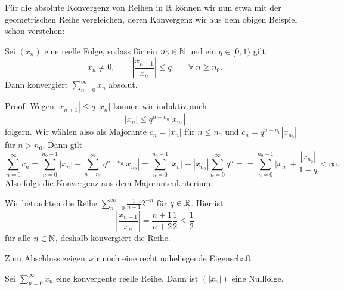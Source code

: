 Für die absolute Konvergenz von Reihen in \(\mathbb{R}\) können wir nun etwa mit der geometrischen Reihe vergleichen, deren Konvergenz wir aus dem obigen Beispiel schon verstehen:
\label{metrik/reihen:theorem-7}
\begin{theorem}{}{}



Sei \((x_n)\) eine reelle Folge, sodass für ein \(n_0 \in \mathbb{N}\) und ein \(q \in [0,1)\) gilt:
\begin{equation*}
x_n \neq 0,\qquad \left\vert \frac{x_{n+1}}{x_n} \right\vert \leq q \qquad \forall~n \geq n_0.
\end{equation*}
Dann konvergiert \(\sum_{n=0}^\infty x_n\) absolut.
\end{theorem}

\begin{emphBox}{}{}
Proof.  Wegen \(|x_{n+1}| \leq q~|x_n|\) können wir induktiv auch
\begin{equation*}
|x_n| \leq q^{n-n_0} |x_{n_0}|
\end{equation*}
folgern. Wir wählen also als Majorante \(c_n= |x_n|\) für \(n \leq n_0\) und \(c_n = q^{n-n_0} |x_{n_0}|\) für
\(n > n_0.\) Dann gilt
\begin{equation*}
 \sum_{n=0}^\infty c_n = \sum_{n=0}^{n_0-1} |x_n| + \sum_{n=n_0}^\infty q^{n-n_0} |x_{n_0}| =\sum_{n=0}^{n_0-1} |x_n| +  |x_{n_0}| \sum_{n=0}^\infty q^{n} = =\sum_{n=0}^{n_0-1} |x_n| +  \frac{|x_{n_0}|}{1-q} < \infty.
\end{equation*}
Also folgt die Konvergenz aus dem Majorantenkriterium.
\end{emphBox}
\label{metrik/reihen:example-8}
\begin{example}{}{}



Wir betrachten die Reihe \(\sum_{n=0}^\infty \frac{1}{n+1} 2^{-n}\) für \(q \in \mathbb{R}\). Hier ist
\begin{equation*}
  \left\vert \frac{x_{n+1}}{x_n} \right\vert  = \frac{n+1}{n+2} \frac{1}2 \leq \frac{1}2
\end{equation*}
für alle \(n \in \mathbb{N}\), deshalb konvergiert die Reihe.
\end{example}

Zum Abschluss zeigen wir noch eine recht naheliegende Eigenschaft
\label{metrik/reihen:lemma-9}
\begin{lemma}{}{}



Sei \(\sum_{n=0}^\infty x_n\) eine konvergente reelle Reihe. Dann ist \((|x_n|)\) eine Nullfolge.
\end{lemma}

